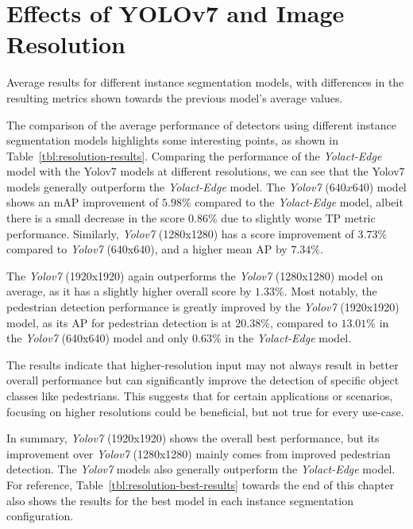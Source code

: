
\section{Effects of YOLOv7 and Image Resolution}
\label{sec:impactyolov7}

\begin{table}[htbp]
    
    \caption{Average results for different instance segmentation models, with differences in the resulting metrics shown towards the previous model's average values.}
    \label{tbl:resolution-results}
\end{table}

The comparison of the average performance of detectors using different instance segmentation models highlights some interesting points, as shown in Table~\ref{tbl:resolution-results}.
Comparing the performance of the \textit{Yolact-Edge} model with the Yolov7 models at different resolutions, we can see that the Yolov7 models generally outperform the \textit{Yolact-Edge} model.
The \textit{Yolov7} ($640x640$) model shows an mAP improvement of $5.98\%$ compared to the \textit{Yolact-Edge} model, albeit there is a small decrease in the score $0.86\%$ due to slightly worse TP metric performance.
Similarly, \textit{Yolov7} (1280x1280) has a score improvement of $3.73\%$ compared to \textit{Yolov7} (640x640), and a higher mean AP by $7.34\%$.

The \textit{Yolov7} (1920x1920) again outperforms the \textit{Yolov7} (1280x1280) model on average, as it has a slightly higher overall score by $1.33\%$.
Most notably, the pedestrian detection performance is greatly improved by the \textit{Yolov7} (1920x1920) model, as its AP for pedestrian detection is at $20.38\%$, compared to $13.01\%$ in the \textit{Yolov7} (640x640) model and only $0.63\%$ in the \textit{Yolact-Edge} model.

The results indicate that higher-resolution input may not always result in better overall performance but can significantly improve the detection of specific object classes like pedestrians.
This suggests that for certain applications or scenarios, focusing on higher resolutions could be beneficial, but not true for every use-case.

In summary, \textit{Yolov7} (1920x1920) shows the overall best performance, but its improvement over \textit{Yolov7} (1280x1280) mainly comes from improved pedestrian detection.
The \textit{Yolov7} models also generally outperform the \textit{Yolact-Edge} model.
For reference, Table~\ref{tbl:resolution-best-results} towards the end of this chapter also shows the results for the best model in each instance segmentation configuration.

